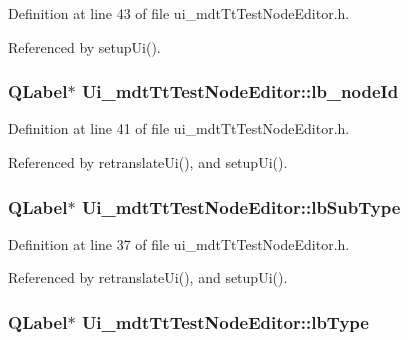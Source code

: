 Definition at line 43 of file ui\-\_\-mdt\-Tt\-Test\-Node\-Editor.\-h.



Referenced by setup\-Ui().

\hypertarget{class_ui__mdt_tt_test_node_editor_a355c71a1917303359078289bd6c772a8}{
\subsubsection[{lb\-\_\-node\-Id}]{\setlength{\rightskip}{0pt plus 5cm}Q\-Label$\ast$ Ui\-\_\-mdt\-Tt\-Test\-Node\-Editor\-::lb\-\_\-node\-Id}}\label{class_ui__mdt_tt_test_node_editor_a355c71a1917303359078289bd6c772a8}


Definition at line 41 of file ui\-\_\-mdt\-Tt\-Test\-Node\-Editor.\-h.



Referenced by retranslate\-Ui(), and setup\-Ui().

\hypertarget{class_ui__mdt_tt_test_node_editor_af4e675dc76fb542bb1f8f923203686b4}{
\subsubsection[{lb\-Sub\-Type}]{\setlength{\rightskip}{0pt plus 5cm}Q\-Label$\ast$ Ui\-\_\-mdt\-Tt\-Test\-Node\-Editor\-::lb\-Sub\-Type}}\label{class_ui__mdt_tt_test_node_editor_af4e675dc76fb542bb1f8f923203686b4}


Definition at line 37 of file ui\-\_\-mdt\-Tt\-Test\-Node\-Editor.\-h.



Referenced by retranslate\-Ui(), and setup\-Ui().

\hypertarget{class_ui__mdt_tt_test_node_editor_a096da237fbb87146c89298a28a2c378c}{
\subsubsection[{lb\-Type}]{\setlength{\rightskip}{0pt plus 5cm}Q\-Label$\ast$ Ui\-\_\-mdt\-Tt\-Test\-Node\-Editor\-::lb\-Type}}\label{class_ui__mdt_tt_test_node_editor_a096da237fbb87146c89298a28a2c378c}


